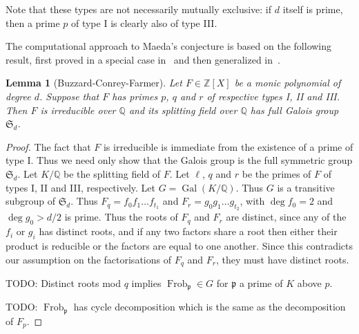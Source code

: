 \documentclass[11pt]{article}
\theoremstyle{plain}
\newtheorem{lemma}[theorem]{Lemma}
\theoremstyle{definition}
\theoremstyle{remark}
\numberwithin{equation}{section}
\numberwithin{table}{section}
\newcommand{\ZZ}{\mathbb{Z}}
\newcommand{\QQ}{\mathbb{Q}}
\renewcommand{\SS}{\mathfrak{S}}
\newcommand{\Frob}{\operatorname{Frob}}
\newcommand{\Gal}{\operatorname{Gal}}
\begin{document}
Note that these types are not necessarily mutually exclusive: if $d$ itself is
prime, then a prime $p$ of type I is clearly also of type III.

The computational approach to Maeda's conjecture is based on the following
result, first proved in a special case in~\cite{Buzzard} and then generalized
in~\cite{ConreyFarmer}.

\begin{lemma}[Buzzard-Conrey-Farmer]
  Let $F\in\ZZ[X]$ be a monic polynomial of degree $d$.  Suppose that $F$ has
  primes $p$, $q$ and $r$ of respective types I, II and III.  Then $F$
  is irreducible over $\QQ$ and its splitting field over $\QQ$ has full Galois
  group $\SS_d$.
\end{lemma}
\begin{proof}
  The fact that $F$ is irreducible is immediate from the existence of a prime of type
  I. Thus we need only show that the Galois group is the full symmetric group $\SS_d$.
  Let $K/\QQ$ be the splitting field of $F$. Let $\ell$, $q$ and $r$ be the primes of
  $F$ of types I, II and III, respectively. Let $G=\Gal(K/\QQ)$. Thus
  $G$ is a transitive subgroup of $\SS_d$. Thus $F_q = f_0 f_1 \ldots f_{t_1}$ and
  $F_r = g_0 g_1 \ldots g_{t_2}$, with $\deg f_0 = 2$ and $\deg g_0 > d/2$ is prime.
  Thus the roots of $F_q$ and $F_r$ are distinct, since any of the $f_i$ or $g_i$ has
  distinct roots, and if any two factors share a root then either their product is
  reducible or the factors are equal to one another. Since this contradicts our
  assumption on the factorisations of $F_q$ and $F_r$, they must have distinct roots.

  TODO: Distinct roots mod $q$ implies $\Frob_{\mathfrak{p}} \in G$ for
  $\mathfrak{p}$
  a prime of $K$ above $p$.

  TODO: $\Frob_{\mathfrak{p}}$ has cycle decomposition which is the same as the
  decomposition of $F_p$.


\end{proof}
\end{document}
